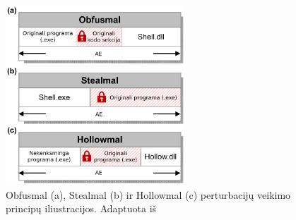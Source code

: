 \begin{figure}[h]
    \begin{small}
        \caption{Obfusmal (a), Stealmal (b) ir Hollowmal (c) perturbacijų veikimo principų iliustracijos. Adaptuota iš \cite{zhongReinforcementLearningBased2022}}\label{fig:perturbations}
        \begin{center}
            \includegraphics[width=0.6\textwidth]{img/complex-perturbations.png}
        \end{center}
    \end{small}
\end{figure}